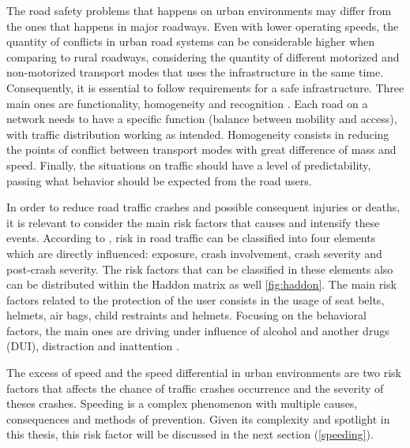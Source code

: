 
The road safety problems that happens on urban environments may differ from the ones that happens in major roadways. Even with lower operating speeds, the quantity of conflicts in urban road systems can be considerable higher when comparing to rural roadways, considering the quantity of different motorized and non-motorized transport modes that uses the infrastructure in the same time. Consequently, it is essential to follow requirements for a safe infrastructure. Three main ones are functionality, homogeneity and recognition \cite{SWOV2003}. Each road on a network needs to have a specific function (balance between mobility and access), with traffic distribution working as intended. Homogeneity consists in reducing the points of conflict between transport modes with great difference of mass and speed. Finally, the situations on traffic should have a level of predictability, passing what behavior should be expected from the road users.


In order to reduce road traffic crashes and possible consequent injuries or deaths, it is relevant to consider the main risk factors that causes and intensify these events. According to \textcite{WHO2004}, risk in road traffic can be classified into four elements which are directly influenced: exposure, crash involvement, crash severity and post-crash severity. The risk factors that can be classified in these elements also can be distributed within the Haddon matrix as well \autoref{fig:haddon}. The main risk factors related to the protection of the user consists in the usage of seat belts, helmets, air bags, child restraints and helmets. Focusing on the behavioral factors, the main ones are driving under influence of alcohol and another drugs (DUI), distraction and inattention \cite{Shinar2017}.


The excess of speed and the speed differential in urban environments are two risk factors that affects the chance of traffic crashes occurrence and the severity of theses crashes. Speeding is a complex phenomenon with multiple causes, consequences and methods of prevention. Given its complexity and spotlight in this thesis, this risk factor will be discussed in the next section (\ref{speeding}). 

